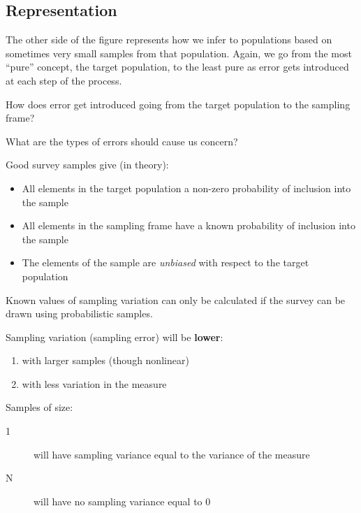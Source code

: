 \documentclass[11pt]{lecturenotes}
\begin{document}
\subsection[40]{Representation}
The other side of the figure represents how we infer to populations based on sometimes very small samples from that population. Again, we go from the most ``pure'' concept, the target population, to the least pure as error gets introduced at each step of the process. 



How does error get introduced going from the target population to the sampling frame? 

What are the types of errors should cause us concern?


Good survey samples give (in theory): 

\begin{itemize}
\item All elements in the target population a non-zero probability of inclusion into the sample
\item All elements in the sampling frame have a known probability of inclusion into the sample
\item The elements of the sample are \emph{unbiased} with respect to the target population
\end{itemize}


Known values of sampling variation can only be calculated if the survey can be drawn using probabilistic samples.

Sampling variation (sampling error) will be \textbf{lower}:
\begin{enumerate}
\item with larger samples (though nonlinear)
\item with less variation in the measure
\end{enumerate} 

Samples of size: 
\begin{description}
\item[1] will have sampling variance equal to the variance of the measure
\item[N] will have no sampling variance equal to 0 
\end{description}
\end{document}
